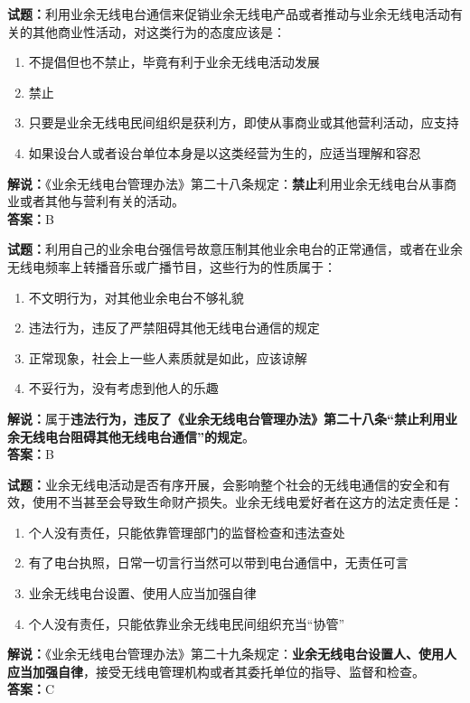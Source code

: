 \documentclass{ctexbook}
\begin{document}
\bigskip


\noindent\textbf{试题：}利用业余无线电台通信来促销业余无线电产品或者推动与业余无线电活动有关的其他商业性活动，对这类行为的态度应该是：
\begin{enumerate}[leftmargin=3em]
\item 不提倡但也不禁止，毕竟有利于业余无线电活动发展
\item 禁止
\item 只要是业余无线电民间组织是获利方，即使从事商业或其他营利活动，应支持
\item 如果设台人或者设台单位本身是以这类经营为生的，应适当理解和容忍
\end{enumerate}
\noindent\textbf{解说：}《业余无线电台管理办法》第二十八条规定：\textbf{禁止}利用业余无线电台从事商业或者其他与营利有关的活动。\\\noindent\textbf{答案：}B



\bigskip


\noindent\textbf{试题：}利用自己的业余电台强信号故意压制其他业余电台的正常通信，或者在业余无线电频率上转播音乐或广播节目，这些行为的性质属于：
\begin{enumerate}[leftmargin=3em]
\item 不文明行为，对其他业余电台不够礼貌
\item 违法行为，违反了严禁阻碍其他无线电台通信的规定
\item 正常现象，社会上一些人素质就是如此，应该谅解
\item 不妥行为，没有考虑到他人的乐趣
\end{enumerate}
\noindent\textbf{解说：}属于\textbf{违法行为，违反了《业余无线电台管理办法》第二十八条“禁止利用业余无线电台阻碍其他无线电台通信”的规定}。\\\noindent\textbf{答案：}B



\bigskip


\noindent\textbf{试题：}业余无线电活动是否有序开展，会影响整个社会的无线电通信的安全和有效，使用不当甚至会导致生命财产损失。业余无线电爱好者在这方的法定责任是：
\begin{enumerate}[leftmargin=3em]
\item 个人没有责任，只能依靠管理部门的监督检查和违法查处
\item 有了电台执照，日常一切言行当然可以带到电台通信中，无责任可言
\item 业余无线电台设置、使用人应当加强自律
\item 个人没有责任，只能依靠业余无线电民间组织充当“协管”
\end{enumerate}
\noindent\textbf{解说：}《业余无线电台管理办法》第二十九条规定：\textbf{业余无线电台设置人、使用人应当加强自律}，接受无线电管理机构或者其委托单位的指导、监督和检查。\\\noindent\textbf{答案：}C
\end{document}
